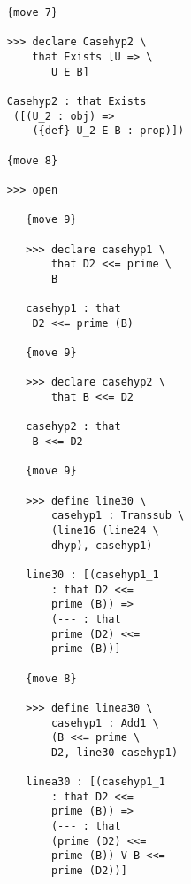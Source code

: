 \documentclass[12pt]{article}
\begin{document}
\begin{verbatim}
                        {move 7}

                        >>> declare Casehyp2 \
                            that Exists [U => \
                               U E B]

                        Casehyp2 : that Exists 
                         ([(U_2 : obj) => 
                            ({def} U_2 E B : prop)])

                        {move 8}

                        >>> open

                           {move 9}

                           >>> declare casehyp1 \
                               that D2 <<= prime \
                               B

                           casehyp1 : that 
                            D2 <<= prime (B)

                           {move 9}

                           >>> declare casehyp2 \
                               that B <<= D2

                           casehyp2 : that 
                            B <<= D2

                           {move 9}

                           >>> define line30 \
                               casehyp1 : Transsub \
                               (line16 (line24 \
                               dhyp), casehyp1)

                           line30 : [(casehyp1_1 
                               : that D2 <<= 
                               prime (B)) => 
                               (--- : that 
                               prime (D2) <<= 
                               prime (B))]

                           {move 8}

                           >>> define linea30 \
                               casehyp1 : Add1 \
                               (B <<= prime \
                               D2, line30 casehyp1)

                           linea30 : [(casehyp1_1 
                               : that D2 <<= 
                               prime (B)) => 
                               (--- : that 
                               (prime (D2) <<= 
                               prime (B)) V B <<= 
                               prime (D2))]


\end{verbatim}
\end{document}
